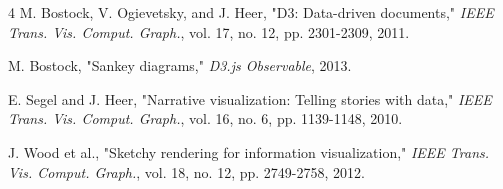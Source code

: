 \documentclass[conference]{IEEEtran}
\begin{document}
\begin{thebibliography}{4}
\footnotesize
{}
M. Bostock, V. Ogievetsky, and J. Heer, "D3: Data-driven documents," \textit{IEEE Trans. Vis. Comput. Graph.}, vol. 17, no. 12, pp. 2301-2309, 2011.

M. Bostock, "Sankey diagrams," \textit{D3.js Observable}, 2013.

E. Segel and J. Heer, "Narrative visualization: Telling stories with data," \textit{IEEE Trans. Vis. Comput. Graph.}, vol. 16, no. 6, pp. 1139-1148, 2010.

J. Wood et al., "Sketchy rendering for information visualization," \textit{IEEE Trans. Vis. Comput. Graph.}, vol. 18, no. 12, pp. 2749-2758, 2012.

\end{thebibliography}
\end{document}
